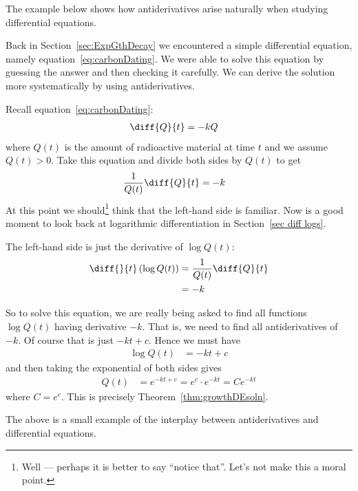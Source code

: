 The example below shows how antiderivatives arise naturally when studying differential equations.
\begin{eg}\label{eg_4_1_2}
Back in Section~\ref{sec:ExpGthDecay} we encountered a simple differential
equation, namely equation~\ref{eq:carbonDating}. We were able to solve this
equation by guessing the answer and then checking it carefully. We can derive
the solution more systematically by using antiderivatives.

Recall equation~\ref{eq:carbonDating}:
\begin{align*}
  \diff{Q}{t} &= -k Q
\end{align*}
where $Q(t)$ is the amount of radioactive material at time $t$ and we assume
$Q(t) > 0$. Take this equation and divide both sides by $Q(t)$ to get
\begin{align*}
  \frac{1}{Q(t)} \diff{Q}{t} &= -k
\end{align*}
At this point we should\footnote{Well --- perhaps it is better to say ``notice
that''. Let's not make this a moral point.} think that the left-hand side is
familiar. Now is a good moment to look back at logarithmic differentiation
in Section~\ref{sec diff logs}.

The left-hand side is just the derivative of $\log Q(t)$:
\begin{align*}
  \diff{}{t}\left( \log Q(t) \right) &= \frac{1}{Q(t)} \diff{Q}{t} \\
  &= -k
\end{align*}

So to solve this equation, we are really being asked to find all functions
$\log Q(t)$ having derivative $-k$. That is, we need to find  all
antiderivatives of $-k$. Of course that is just $-kt + c$. Hence we must have
\begin{align*}
  \log Q(t) &= -kt +c
\end{align*}
and then taking the exponential of both sides gives
\begin{align*}
  Q(t) &= e^{-kt+c} = e^c \cdot e^{-kt}  = C e^{-kt}
\end{align*}
where $C = e^c$. This is precisely Theorem~\ref{thm:growthDEsoln}.
\end{eg}
The above is a small example of the interplay between antiderivatives and
differential equations.


